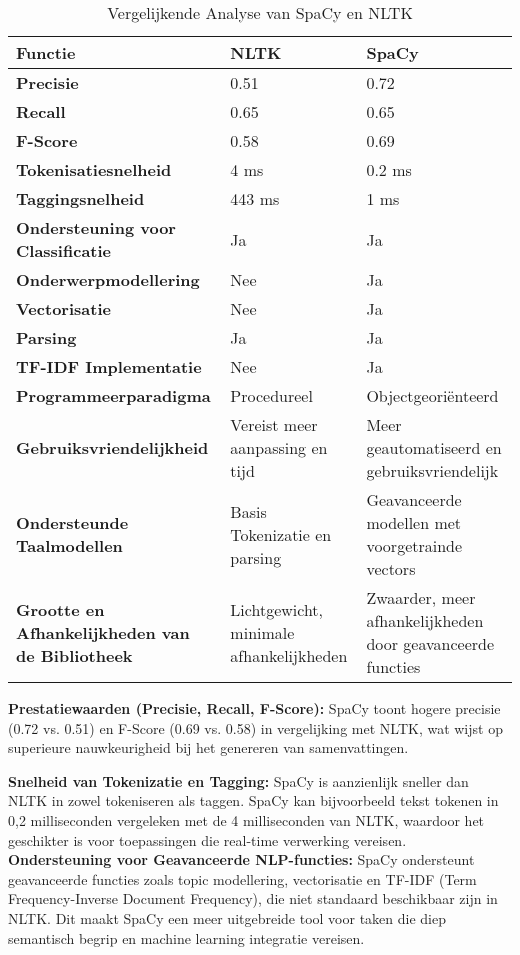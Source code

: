 \autocite{amade2024automatic}
\begin{table}[h!]
    \centering
    \begin{tabular}{|p{4cm}|p{5cm}|p{5cm}|}
        \hline
        \textbf{Functie} & \textbf{NLTK} & \textbf{SpaCy} \\ \hline
        \textbf{Precisie} & 0.51 & 0.72 \\ \hline
        \textbf{Recall} & 0.65 & 0.65 \\ \hline
        \textbf{F-Score} & 0.58 & 0.69 \\ \hline
        \textbf{Tokenisatiesnelheid} & 4 ms & 0.2 ms \\ \hline
        \textbf{Taggingsnelheid} & 443 ms & 1 ms \\ \hline
        \textbf{Ondersteuning voor Classificatie} & Ja & Ja \\ \hline
        \textbf{Onderwerpmodellering} & Nee & Ja \\ \hline
        \textbf{Vectorisatie} & Nee & Ja \\ \hline
        \textbf{Parsing} & Ja & Ja \\ \hline
        \textbf{TF-IDF Implementatie} & Nee & Ja \\ \hline
        \textbf{Programmeerparadigma} & Procedureel & Objectgeoriënteerd \\ \hline
        \textbf{Gebruiksvriendelijkheid} & Vereist meer aanpassing en tijd & Meer geautomatiseerd en gebruiksvriendelijk \\ \hline
        \textbf{Ondersteunde Taalmodellen} & Basis Tokenizatie en parsing & Geavanceerde modellen met voorgetrainde vectors \\ \hline
        \textbf{Grootte en Afhankelijkheden van de Bibliotheek} & Lichtgewicht, minimale afhankelijkheden & Zwaarder, meer afhankelijkheden door geavanceerde functies \\ \hline
    \end{tabular}
    \caption{Vergelijkende Analyse van SpaCy en NLTK}
    \label{tab:comparison}
\end{table}


\textbf{Prestatiewaarden (Precisie, Recall, F-Score):} SpaCy toont hogere precisie (0.72 vs. 0.51) en F-Score (0.69 vs. 0.58) in vergelijking met NLTK, wat wijst op superieure nauwkeurigheid bij het genereren van samenvattingen.

\textbf{Snelheid van Tokenizatie en Tagging:} SpaCy is aanzienlijk sneller dan NLTK in zowel tokeniseren als taggen. SpaCy kan bijvoorbeeld tekst tokenen in 0,2 milliseconden vergeleken met de 4 milliseconden van NLTK, waardoor het geschikter is voor toepassingen die real-time verwerking vereisen.
\textbf{Ondersteuning voor Geavanceerde NLP-functies:} SpaCy ondersteunt geavanceerde functies zoals topic modellering, vectorisatie en TF-IDF (Term Frequency-Inverse Document Frequency), die niet standaard beschikbaar zijn in NLTK. Dit maakt SpaCy een meer uitgebreide tool voor taken die diep semantisch begrip en machine learning integratie vereisen.

